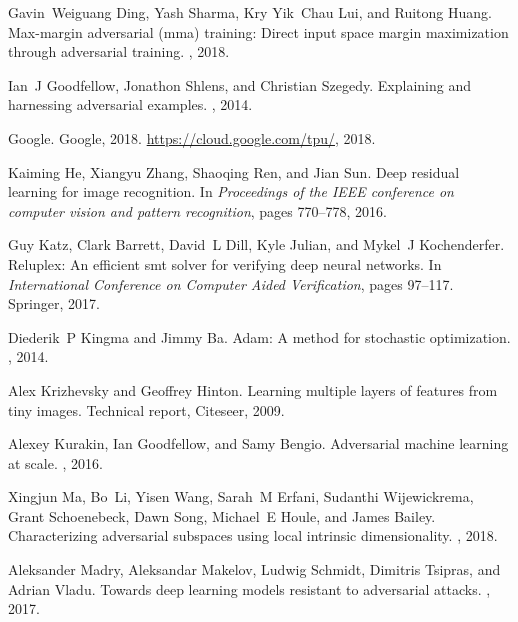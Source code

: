\documentclass{article}
\theoremstyle{plain}
\theoremstyle{definition}
\theoremstyle{remark}
\begin{document}
\begin{thebibliography}{10}
Gavin~Weiguang Ding, Yash Sharma, Kry Yik~Chau Lui, and Ruitong Huang.
\newblock Max-margin adversarial (mma) training: Direct input space margin
  maximization through adversarial training.
, 2018.

Ian~J Goodfellow, Jonathon Shlens, and Christian Szegedy.
\newblock Explaining and harnessing adversarial examples.
, 2014.

Google.
\newblock Google, 2018.
\newblock \url{https://cloud.google.com/tpu/}, 2018.

Kaiming He, Xiangyu Zhang, Shaoqing Ren, and Jian Sun.
\newblock Deep residual learning for image recognition.
\newblock In {\em Proceedings of the IEEE conference on computer vision and
  pattern recognition}, pages 770--778, 2016.

Guy Katz, Clark Barrett, David~L Dill, Kyle Julian, and Mykel~J Kochenderfer.
\newblock Reluplex: An efficient smt solver for verifying deep neural networks.
\newblock In {\em International Conference on Computer Aided Verification},
  pages 97--117. Springer, 2017.

Diederik~P Kingma and Jimmy Ba.
\newblock Adam: A method for stochastic optimization.
, 2014.

Alex Krizhevsky and Geoffrey Hinton.
\newblock Learning multiple layers of features from tiny images.
\newblock Technical report, Citeseer, 2009.

Alexey Kurakin, Ian Goodfellow, and Samy Bengio.
\newblock Adversarial machine learning at scale.
, 2016.

Xingjun Ma, Bo~Li, Yisen Wang, Sarah~M Erfani, Sudanthi Wijewickrema, Grant
  Schoenebeck, Dawn Song, Michael~E Houle, and James Bailey.
\newblock Characterizing adversarial subspaces using local intrinsic
  dimensionality.
, 2018.

Aleksander Madry, Aleksandar Makelov, Ludwig Schmidt, Dimitris Tsipras, and
  Adrian Vladu.
\newblock Towards deep learning models resistant to adversarial attacks.
, 2017.


\end{thebibliography}
\end{document}
